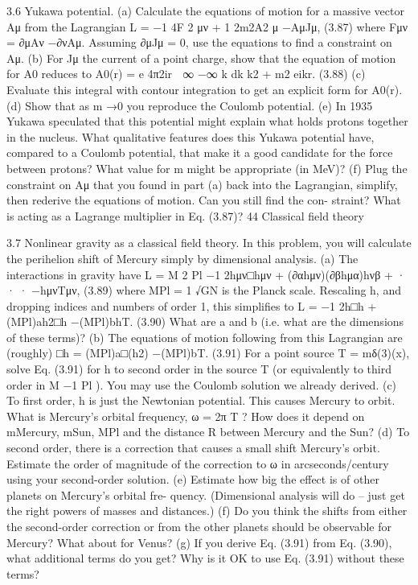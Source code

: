 3.6 Yukawa potential.
(a) Calculate the equations of motion for a massive vector Aμ from the Lagrangian
L = −1
4F 2
μν + 1
2m2A2
μ −AμJμ,
(3.87)
where Fμν = ∂μAν −∂νAμ. Assuming ∂μJμ = 0, use the equations to ﬁnd a
constraint on Aμ.
(b) For Jμ the current of a point charge, show that the equation of motion for A0
reduces to
A0(r) =
e
4π2ir
 ∞
−∞
k dk
k2 + m2 eikr.
(3.88)
(c) Evaluate this integral with contour integration to get an explicit form for A0(r).
(d) Show that as m →0 you reproduce the Coulomb potential.
(e) In 1935 Yukawa speculated that this potential might explain what holds protons
together in the nucleus. What qualitative features does this Yukawa potential
have, compared to a Coulomb potential, that make it a good candidate for the
force between protons? What value for m might be appropriate (in MeV)?
(f) Plug the constraint on Aμ that you found in part (a) back into the Lagrangian,
simplify, then rederive the equations of motion. Can you still ﬁnd the con-
straint? What is acting as a Lagrange multiplier in Eq. (3.87)?
44
Classical ﬁeld theory

3.7 Nonlinear gravity as a classical ﬁeld theory. In this problem, you will calculate the
perihelion shift of Mercury simply by dimensional analysis.
(a) The interactions in gravity have
L = M 2
Pl
−1
2hμν□hμν + (∂αhμν)(∂βhμα)hνβ + · · ·
−hμνTμν, (3.89)
where MPl =
1
√GN is the Planck scale. Rescaling h, and dropping indices and
numbers of order 1, this simpliﬁes to
L = −1
2h□h + (MPl)ah2□h −(MPl)bhT.
(3.90)
What are a and b (i.e. what are the dimensions of these terms)?
(b) The equations of motion following from this Lagrangian are (roughly)
□h = (MPl)a□(h2) −(MPl)bT.
(3.91)
For a point source T = mδ(3)(x), solve Eq. (3.91) for h to second order in the
source T (or equivalently to third order in M −1
Pl ). You may use the Coulomb
solution we already derived.
(c) To ﬁrst order, h is just the Newtonian potential. This causes Mercury to
orbit. What is Mercury’s orbital frequency, ω = 2π
T ? How does it depend on
mMercury, mSun, MPl and the distance R between Mercury and the Sun?
(d) To second order, there is a correction that causes a small shift Mercury’s orbit.
Estimate the order of magnitude of the correction to ω in arcseconds/century
using your second-order solution.
(e) Estimate how big the effect is of other planets on Mercury’s orbital fre-
quency. (Dimensional analysis will do – just get the right powers of masses
and distances.)
(f) Do you think the shifts from either the second-order correction or from the
other planets should be observable for Mercury? What about for Venus?
(g) If you derive Eq. (3.91) from Eq. (3.90), what additional terms do you get?
Why is it OK to use Eq. (3.91) without these terms?

